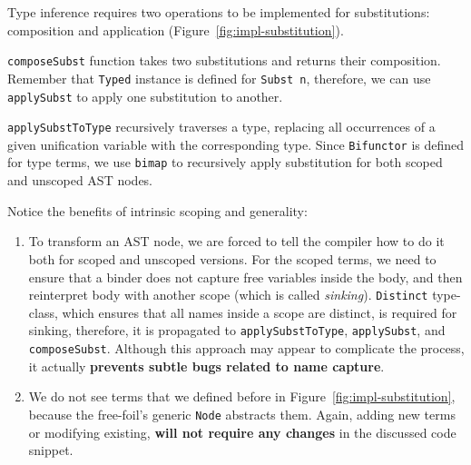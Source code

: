 Type inference requires two operations to be implemented for substitutions: composition and application (Figure~\ref{fig:impl-substitution}).

\texttt{composeSubst} function takes two substitutions and returns their composition. Remember that \texttt{Typed} instance is defined for \texttt{Subst n}, therefore, we can use \texttt{applySubst} to apply one substitution to another.

\texttt{applySubstToType} recursively traverses a type, replacing all occurrences of a given unification variable with the corresponding type. Since \texttt{Bifunctor} is defined for type terms, we use \texttt{bimap} to recursively apply substitution for both scoped and unscoped AST nodes.

Notice the benefits of intrinsic scoping and generality:

\begin{enumerate}
  \item To transform an AST node, we are forced to tell the compiler how to do it both for scoped and unscoped versions. For the scoped terms, we need to ensure that a binder does not capture free variables inside the body, and then reinterpret body with another scope (which is called \emph{sinking}). \texttt{Distinct} type-class, which ensures that all names inside a scope are distinct, is required for sinking, therefore, it is propagated to \texttt{applySubstToType}, \texttt{applySubst}, and \texttt{composeSubst}. Although this approach may appear to complicate the process, it actually \textbf{prevents subtle bugs related to name capture}.
  \item We do not see terms that we defined before in Figure~\ref{fig:impl-substitution}, because the free-foil's generic \texttt{Node} abstracts them. Again, adding new terms or modifying existing, \textbf{will not require any changes} in the discussed code snippet.
\end{enumerate}

